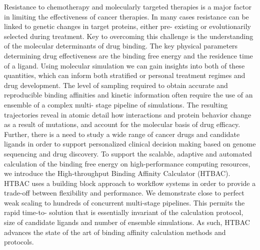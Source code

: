 Resistance to chemotherapy and molecularly targeted therapies is a major
factor in limiting the effectiveness of cancer therapies. In many cases
resistance can be linked to genetic changes in target proteins, either pre-
existing or evolutionarily selected during treatment. Key to overcoming this
challenge is the understanding of the molecular determinants of drug binding.
The key physical parameters determining drug effectiveness are the binding
free energy and the residence time of a ligand. Using molecular simulation we
can gain insights into both of these quantities, which can inform both
stratified or personal treatment regimes and drug development. The level of
sampling required to obtain accurate and reproducible binding affinities and
kinetic information often require the use of an ensemble of a complex multi-
stage pipeline of simulations. The resulting trajectories reveal in atomic
detail how interactions and protein behavior change as a result of mutations,
and account for the molecular basis of drug efficacy. Further, there is a need
to study a wide range of cancer drugs and candidate ligands in order to
support personalized clinical decision making based on genome sequencing and
drug discovery. To support the scalable, adaptive and automated calculation of
the binding free energy on high-performance computing resources, we introduce
the High-throughput Binding Affinity Calculator (HTBAC). HTBAC uses a building
block approach to workflow systems in order to provide a trade-off between
flexibility and performance. We demonstrate close to perfect weak scaling to
hundreds of concurrent multi-stage pipelines. This permits the rapid time-to-
solution that is essentially invariant of the calculation protocol, size of
candidate ligands and number of ensemble simulations. As such, HTBAC advances
the state of the art of binding affinity calculation methods and protocols.






